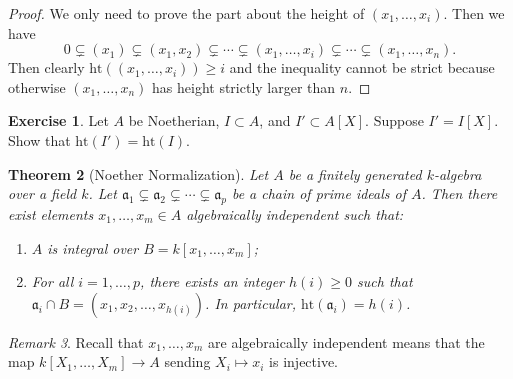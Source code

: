 \documentclass[leqno, openany]{memoir}
\newtheorem{thm}{Theorem}[section]
\theoremstyle{definition}
\newtheorem{exer}[thm]{Exercise}
\theoremstyle{remark}
\newtheorem{rmk}[thm]{Remark}
\theoremstyle{plain}
\theoremstyle{definition}
\theoremstyle{remark}
\newcommand{\mf}[1]{\mathfrak{#1}}
\newcommand{\mr}[1]{\mathrm{#1}}
\begin{document}
\begin{proof}
    We only need to prove the part about the height of $(x_1, \ldots, x_i)$. Then we have
    \[ 0 \subsetneq (x_1) \subsetneq (x_1, x_2) \subsetneq \cdots \subsetneq (x_1, \ldots, x_i) \subsetneq \cdots \subsetneq (x_1, \ldots, x_n). \]
    Then clearly $\mr{ht}((x_1, \ldots, x_i)) \geq i$ and the inequality cannot be strict because otherwise $(x_1, \ldots, x_n)$ has height strictly larger than $n$.
\end{proof}

\begin{exer}
    Let $A$ be Noetherian, $I \subset A$, and $I' \subset A[X]$. Suppose $I' = I[X]$. Show that $\mr{ht}(I') = \mr{ht}(I)$.
\end{exer}

\begin{thm}[Noether Normalization]
    Let $A$ be a finitely generated $k$-algebra over a field $k$. Let $\mf{a}_1 \subsetneq \mf{a}_2 \subsetneq \cdots \subsetneq \mf{a}_p$ be a chain of prime ideals of $A$. Then there exist elements $x_1, \ldots, x_m \in A$ algebraically independent such that:
    \begin{enumerate}
        \item $A$ is integral over $B = k[x_1, \ldots, x_m]$;
        \item For all $i = 1, \ldots, p$, there exists an integer $h(i) \geq 0$ such that $\mf{a}_i \cap B = (x_1, x_2, \ldots, x_{h(i)})$. In particular, $\mr{ht}(\mf{a}_i) = h(i)$.
    \end{enumerate}
\end{thm}

\begin{rmk}
    Recall that $x_1, \ldots, x_m$ are algebraically independent means that the map $k[X_1, \ldots, X_m] \to A$ sending $X_i \mapsto x_i$ is injective.
\end{rmk}
\end{document}
